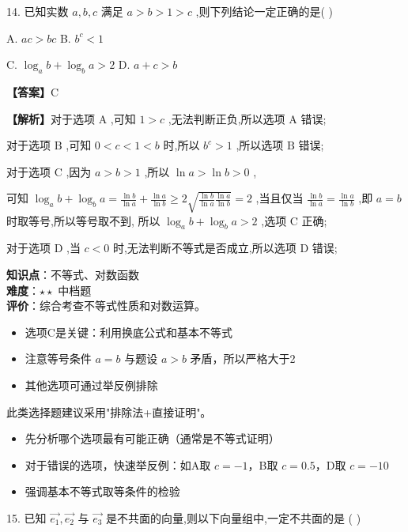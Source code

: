 \documentclass[10pt]{article}
\begin{document}
14. 已知实数 \(a,b,c\) 满足 \(a > b > 1 > c\) ,则下列结论一定正确的是( )

A. \({ac} > {bc}\) B. \({b}^{c} < 1\)

C. \({\log }_{a}b + {\log }_{b}a > 2\) D. \(a + c > b\)

\textbf{【答案】}C

\textbf{【解析】}对于选项 \(\mathrm{A}\) ,可知 \(1 > c\) ,无法判断正负,所以选项 \(\mathrm{A}\) 错误;

对于选项 \(\mathrm{B}\) ,可知 \(0 < c < 1 < b\) 时,所以 \({b}^{c} > 1\) ,所以选项 \(\mathrm{B}\) 错误;

对于选项 \(\mathrm{C}\) ,因为 \(a > b > 1\) ,所以 \(\ln a > \ln b > 0\) ,

可知 \({\log }_{a}b + {\log }_{b}a = \frac{\ln b}{\ln a} + \frac{\ln a}{\ln b} \geq  2\sqrt{\frac{\ln b}{\ln a}\frac{\ln a}{\ln b}} = 2\) ,当且仅当 \(\frac{\ln b}{\ln a} = \frac{\ln a}{\ln b}\) ,即 \(a = b\) 时取等号,所以等号取不到, 所以 \({\log }_{a}b + {\log }_{b}a > 2\) ,选项 \(\mathrm{C}\) 正确;

对于选项 \(\mathrm{D}\) ,当 \(c < 0\) 时,无法判断不等式是否成立,所以选项 \(\mathrm{D}\) 错误;

\begin{analysisbox}[考点分析]
\textbf{知识点}：不等式、对数函数\\
\textbf{难度}：\(\star\star\) 中档题\\
\textbf{评价}：综合考查不等式性质和对数运算。
\begin{itemize}
\item 选项C是关键：利用换底公式和基本不等式
\item 注意等号条件 \(a=b\) 与题设 \(a>b\) 矛盾，所以严格大于2
\item 其他选项可通过举反例排除
\end{itemize}
\end{analysisbox}

\begin{tipbox}[教学提示]
此类选择题建议采用"排除法+直接证明"。
\begin{itemize}
\item 先分析哪个选项最有可能正确（通常是不等式证明）
\item 对于错误的选项，快速举反例：如A取 \(c=-1\)，B取 \(c=0.5\)，D取 \(c=-10\)
\item 强调基本不等式取等条件的检验
\end{itemize}
\end{tipbox}

15. 已知 \(\overrightarrow{{e}_{1}},\overrightarrow{{e}_{2}}\) 与 \(\overrightarrow{{e}_{3}}\) 是不共面的向量,则以下向量组中,一定不共面的是 ( )
\end{document}
